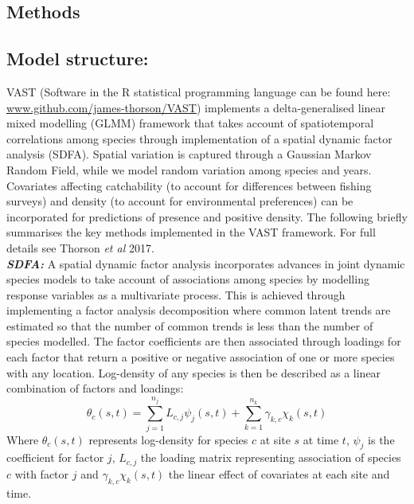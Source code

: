 \documentclass[fleqn,10pt]{wlscirep}
\begin{document}
\begin{linenumbers}
\section*{Methods\\}

\subsection*{Model structure:\\} 

VAST (Software in the R statistical programming language can be found here:
\url{www.github.com/james-thorson/VAST}) implements a delta-generalised linear
mixed modelling (GLMM) framework that takes account of spatiotemporal
correlations among species through implementation of a spatial dynamic factor
analysis (SDFA). Spatial variation is captured through a Gaussian Markov Random
Field, while we model random variation among species and years. Covariates
affecting catchability (to account for differences between fishing surveys) and
density (to account for environmental preferences) can be incorporated for
predictions of presence and positive density. The following briefly summarises
the key methods implemented in the VAST framework. For full details see Thorson
\textit{et al} 2017\cite{Thorson2017}.\\

\textbf{\textit{SDFA:}} A spatial dynamic factor analysis incorporates advances
in joint dynamic species models\cite{Thorson2017} to take account of
associations among species by modelling response variables as a multivariate
process. This is achieved through implementing a factor analysis decomposition
where common latent trends are estimated so that the number of common trends is
less than the number of species modelled. The factor coefficients are then
associated through loadings for each factor that return a positive or negative
association of one or more species with any location. Log-density of any
species is then be described as a linear combination of factors and loadings:
\begin{equation} \theta_{c}(s,t) = \sum_{j=1}^{n_{j}} L_{c,j}\psi_{j}(s,t)
	+\sum_{k=1}^{n_{k}} \gamma_{k,c}\chi_{k}(s,t) \end{equation} Where
$\theta_{c}(s,t)$ represents log-density for species $c$ at site $s$ at time
$t$, $\psi_{j}$ is the coefficient for factor $j$, $L_{c,j}$ the loading matrix
representing association of species $c$ with factor $j$ and
$\gamma_{k,c}\chi_{k}(s,t)$ the linear effect of covariates at each site and
time\cite{Thorson2016b}. \\


\end{linenumbers}
\end{document}
